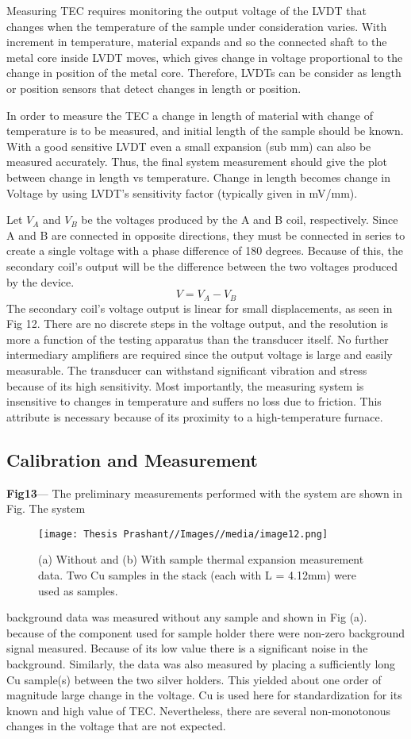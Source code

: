 Measuring TEC requires monitoring the output voltage of the LVDT that changes when the temperature of the sample under consideration varies. With increment in temperature, material expands and so the connected shaft to the metal core inside LVDT moves, which gives change in voltage proportional to the change in position of the metal core. Therefore, LVDTs can
be consider as length or position sensors that detect changes in length or position.

In order to measure the TEC a change in length of material with change of temperature is to be measured, and initial length of the sample should be known. With a good sensitive LVDT even a small expansion (sub mm) can also be measured accurately. Thus, the final system measurement should give the plot between change in length vs temperature. Change in length becomes change in Voltage by using LVDT’s sensitivity factor (typically given in mV/mm).

Let $V_{A}$ and $V_{B}$ be the voltages produced by the A and B coil, respectively. Since A and B are connected in opposite directions, they must be connected in series to create a single voltage with a phase difference of 180 degrees. Because of this, the secondary coil's output will be the difference between the two voltages produced by the device.
$$V = V_{A}-V_{B}$$
The secondary coil’s voltage output is linear for small displacements, as seen in Fig 12. There are no discrete steps in the voltage output, and the resolution is more a function of the testing apparatus than the transducer itself. No further intermediary amplifiers are required since the output voltage is large and easily measurable. The transducer can withstand significant vibration and stress because of its high sensitivity. Most importantly, the measuring system is insensitive to changes in temperature and suffers no loss due to friction. This attribute is necessary because of its proximity to a high-temperature furnace.

\subsection{Calibration and Measurement}
\textbf{Fig13}--- The preliminary measurements performed with the system are shown in Fig. The system
\begin{figure}
    \centering
    \texttt{[image: Thesis Prashant//Images//media/image12.png]}
    \caption{(a) Without and (b) With sample thermal expansion measurement data. Two Cu
samples in the stack (each with L = 4.12mm) were used as samples.}
    \label{fig:enter-label}
\end{figure}
background data was measured without any sample and shown in Fig (a). because of the
component used for sample holder there were non-zero background signal measured. Because
of its low value there is a significant noise in the background. Similarly, the data was also
measured by placing a sufficiently long Cu sample(s) between the two silver holders. This
yielded about one order of magnitude large change in the voltage. Cu is used here for
standardization for its known and high value of TEC. 
Nevertheless, there are several non-monotonous changes in the voltage that are not expected.

